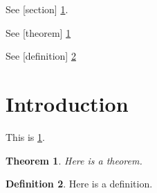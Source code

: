 \documentclass{amsart}
\newtheorem{theorem}{Theorem}
\theoremstyle{definition}
\newtheorem{definition}[theorem]{Definition}
\begin{document}

See [section] \cref{sec:intro}.

See [theorem] \cref{thm:1}

See [definition] \cref{def:1}

\section{Introduction}
\label{sec:intro}

This is \cref{sec:intro}.

\begin{theorem}\label{thm:1}
Here is a theorem.
\end{theorem}

\begin{definition}\label{def:1}
Here is a definition.
\end{definition}
\end{document}
